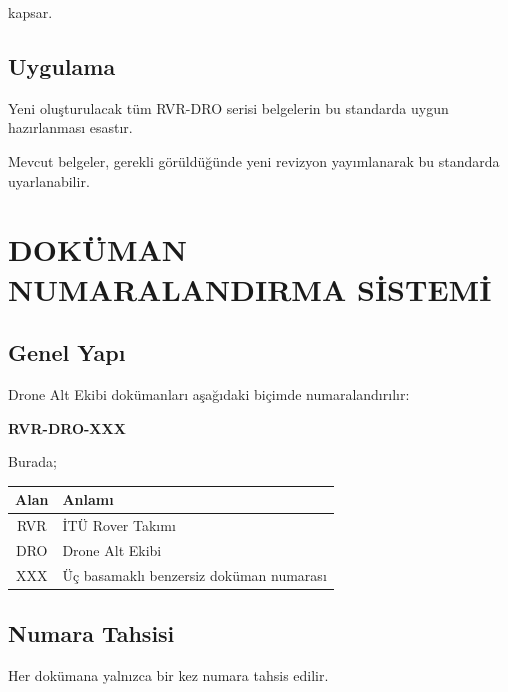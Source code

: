 \documentclass[11pt,a4paper]{article}
\begin{document}
kapsar.

\subsection{Uygulama}

Yeni oluşturulacak tüm RVR-DRO serisi belgelerin bu standarda uygun
hazırlanması esastır.

Mevcut belgeler, gerekli görüldüğünde yeni revizyon yayımlanarak
bu standarda uyarlanabilir.


\newpage

\section{DOKÜMAN NUMARALANDIRMA SİSTEMİ}

\subsection{Genel Yapı}

Drone Alt Ekibi dokümanları aşağıdaki biçimde numaralandırılır:

\begin{center}

\Large
\textbf{RVR-DRO-XXX}

\end{center}

Burada;

\begin{center}

\begin{tabularx}{0.85\textwidth}{|c|X|}
\hline
\textbf{Alan} & \textbf{Anlamı} \\
\hline
RVR & İTÜ Rover Takımı \\
\hline
DRO & Drone Alt Ekibi \\
\hline
XXX & Üç basamaklı benzersiz doküman numarası \\
\hline
\end{tabularx}

\end{center}

\subsection{Numara Tahsisi}

Her dokümana yalnızca bir kez numara tahsis edilir.
\end{document}
